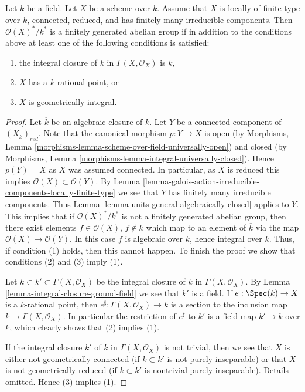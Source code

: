 \begin{proposition}
\label{proposition-units-general}
Let $k$ be a field. Let $X$ be a scheme over $k$. Assume that $X$ is
locally of finite type over $k$, connected, reduced, and has finitely many
irreducible components. Then $\mathcal{O}(X)^*/k^*$ is a finitely generated
abelian group if in addition to the conditions above at least
one of the following conditions is satisfied:
\begin{enumerate}
\item the integral closure of $k$ in $\Gamma(X, \mathcal{O}_X)$ is $k$,
\item $X$ has a $k$-rational point, or
\item $X$ is geometrically integral.
\end{enumerate}
\end{proposition}

\begin{proof}
Let $\overline{k}$ be an algebraic closure of $k$.
Let $Y$ be a connected component of $(X_{\overline{k}})_{red}$.
Note that the canonical morphism $p : Y \to X$ is open (by
Morphisms, Lemma \ref{morphisms-lemma-scheme-over-field-universally-open})
and closed (by
Morphisms, Lemma \ref{morphisms-lemma-integral-universally-closed}).
Hence $p(Y) = X$ as $X$ was assumed connected. In particular, as
$X$ is reduced this implies $\mathcal{O}(X) \subset \mathcal{O}(Y)$. By
Lemma \ref{lemma-galois-action-irreducible-components-locally-finite-type}
we see that $Y$ has finitely many irreducible components.
Thus
Lemma \ref{lemma-units-general-algebraically-closed}
applies to $Y$. This implies that if $\mathcal{O}(X)^*/k^*$ is
not a finitely generated abelian group, then there exist elements
$f \in \mathcal{O}(X)$, $f \not \in k$ which map to an element of
$\overline{k}$ via the map $\mathcal{O}(X) \to \mathcal{O}(Y)$.
In this case $f$ is algebraic over $k$, hence
integral over $k$. Thus, if condition (1) holds, then this cannot happen.
To finish the proof we show that conditions (2) and (3) imply (1).

\medskip\noindent
Let $k \subset k' \subset \Gamma(X, \mathcal{O}_X)$ be the integral
closure of $k$ in $\Gamma(X, \mathcal{O}_X)$. By
Lemma \ref{lemma-integral-closure-ground-field}
we see that $k'$ is a field.
If $e : \Spec(k) \to X$ is a $k$-rational point, then
$e^\sharp : \Gamma(X, \mathcal{O}_X) \to k$ is a section to the
inclusion map $k \to \Gamma(X, \mathcal{O}_X)$. In particular the
restriction of $e^\sharp$ to $k'$ is a field map $k' \to k$ over $k$,
which clearly shows that (2) implies (1).

\medskip\noindent
If the integral closure $k'$ of $k$ in $\Gamma(X, \mathcal{O}_X)$
is not trivial, then we see that $X$ is either not geometrically connected
(if $k \subset k'$ is not purely inseparable) or that $X$ is not
geometrically reduced (if $k \subset k'$ is nontrivial purely inseparable).
Details omitted. Hence (3) implies (1).
\end{proof}

